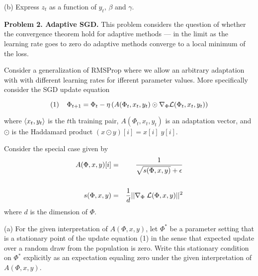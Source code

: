 (b) Express $z_t$ as a function of $y_t$, $\beta$ and $\gamma$.



\bigskip

{\bf Problem 2. Adaptive SGD.}  This problem considers the question of whether the convergence theorem hold for adaptive methods ---
in the limit as the learning rate goes to zero do adaptive methods converge to a local minimum of the loss.

Consider a generalization of RMSProp where we allow an arbitrary adaptation with with different learning rates for
ifferent parameter values.  More specifically consider the SGD update equation

$$(1)\;\;\;\;\Phi_{t+1} = \Phi_t - \eta\left(A(\Phi_t,x_t,y_t)\odot \nabla_\Phi {\cal L}(\Phi_t,x_t,y_t)\right)$$

where ${\mbox{$\langle x_t,y_t\rangle$}}$ is the $t$th training pair, $A(\Phi_t,x_t,y_t)$ is an adaptation vector, and $\odot$ is the Haddamard product $(x \odot y)[i] = x[i]\;y[i]$.

Consider the special case given by
\begin{eqnarray*}
  A(\Phi,x,y)[i] & = & \frac{1}{\sqrt{s(\Phi,x,y)} + \epsilon} \\
  \\
  s(\Phi,x,y) & = & \frac{1}{d} ||\nabla_\Phi\;{\cal L}(\Phi,x,y)||^2 \\
\end{eqnarray*}
where $d$ is the dimension of $\Phi$.
\medskip

(a) For the given interpretation of $A(\Phi,x,y)$, let $\Phi^*$ be a parameter setting that is a stationary point of the update equation (1)
in the sense that expected update over a random draw from the population is zero.  Write this stationary condition
on $\Phi^*$ explicitly as an expectation equaling zero under the given interpretation of $A(\Phi,x,y)$.


